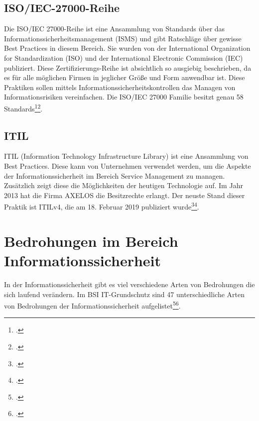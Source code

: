 \subsection{ISO/IEC-27000-Reihe}
Die ISO/IEC 27000-Reihe ist eine Ansammlung von Standards über das Informationssicherheitsmanagement (ISMS) und gibt Ratschläge über gewisse Best Practices in diesem Bereich. Sie wurden von der International Organization for Standardization (ISO) und der International Electronic Commission (IEC) publiziert. 
Diese Zertifizierungs-Reihe ist absichtlich so ausgiebig beschrieben, da es für alle möglichen Firmen in jeglicher Größe und Form anwendbar ist.
Diese Praktiken sollen mittels Informationssicherheitskontrollen das Managen von Informationsrisiken vereinfachen. Die ISO/IEC 27000 Familie besitzt genau 58 Standards\footcite{iso-reihe-wiki}\footcite{iso-reihe-gv}.

\subsection{ITIL}
ITIL (Information Technology Infrastructure Library) ist eine Ansammlung von Best Practices. Diese kann von Unternehmen verwendet werden, um die Aspekte der Informationssicherheit im Bereich Service Management zu managen. Zusätzlich zeigt diese die Möglichkeiten der heutigen Technologie auf. Im Jahr 2013 hat die Firma AXELOS die Besitzrechte erlangt.
Der neuste Stand dieser Praktik ist ITILv4, die am 18. Februar 2019 publiziert wurde\footcite{Lehrunterlagen-HTL-cloud}\footcite{itil}.


\section{Bedrohungen im Bereich Informationssicherheit}
In der Informationssicherheit gibt es viel verschiedene Arten von Bedrohungen die sich laufend verändern. Im BSI IT-Grundschutz sind 47 unterschiedliche Arten von Bedrohungen der Informationssicherheit aufgelistet\footcite{Lehrunterlagen-HTL-cloud}\footcite{bedrohungen}.


